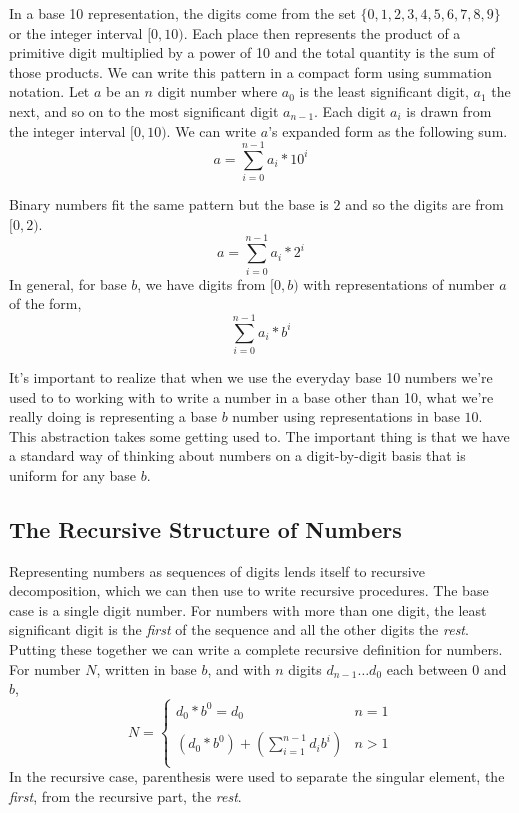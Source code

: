 \documentclass[10pt]{article}
\begin{document}
In a base 10 representation, the digits come from the set $\{0,1,2,3,4,5,6,7,8,9\}$ or the integer interval $[0,10)$. Each place then represents the product of a primitive digit multiplied by a power of 10 and the total quantity is the sum of those products. We can write this pattern in a compact form using summation notation. Let $a$ be an $n$ digit number where $a_0$ is the least significant digit, $a_1$ the next, and so on to the most significant digit $a_{n-1}$. Each digit $a_i$ is drawn from the integer interval $[0,10)$. We can write $a$'s expanded form as the following sum.
\[
a = \sum\limits_{i=0}^{n-1} a_i*10^{i}
\]

Binary numbers fit the same pattern but the base is $2$ and so the digits are from $[0,2)$.
\[
a = \sum\limits_{i=0}^{n-1} a_i*2^{i}
\]
In general, for base $b$, we have digits from $[0,b)$ with representations of number $a$ of the form,
\[
\sum\limits_{i=0}^{n-1} a_i*b^{i}
\]

It's important to realize that when we use the everyday base 10 numbers we're used to to working with to write a number in a base other than 10, what we're really doing is representing a base $b$ number using representations in base $10$. This abstraction takes some getting used to. The important thing is that we have a standard way of thinking about numbers on a digit-by-digit basis that is uniform for any base $b$.

\subsection*{The Recursive Structure of Numbers}

Representing numbers as sequences of digits lends itself to recursive decomposition, which we can then use to write recursive procedures. The base case is a single digit number. For numbers with more than one digit, the least significant digit is the \textit{first} of the sequence and all the other digits the \textit{rest}. Putting these together we can write a complete recursive definition for numbers. For number $N$, written in base $b$, and with $n$ digits $d_{n-1}\ldots d_{0}$ each between $0$ and $b$,
\[
N = \left\{
\begin{array}{ll}
d_0*b^0 = d_0  & n = 1 \\ \\
(d_{0}*b^{0}) + \left(\sum\limits_{i=1}^{n-1}d_{i}b^{i}\right) & n > 1 \\
\end{array}
\right.
\]
In the recursive case, parenthesis were used to separate the singular element, the \textit{first}, from the recursive part, the \textit{rest}.
\end{document}
